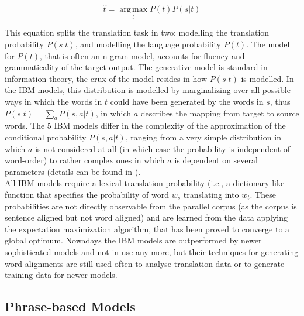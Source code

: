 \documentclass[a4paper, 11pt]{report}
\theoremstyle{definition}
\theoremstyle{plain}
\begin{document}
\[
\hat{t} = \operatorname*{arg\,max}_t P(t)P(s|t)
\]

This equation splits the translation task in two: modelling the translation probability $P(s|t)$, and modelling the language probability $P(t)$. The model for $P(t)$, that is often an n-gram model, accounts for fluency and grammaticality of the target output. The generative model is standard in information theory, the crux of the model resides in how $P(s|t)$ is modelled. In the IBM models, this distribution is modelled by marginalizing over all possible ways in which the words in $t$ could have been generated by the words in $s$, thus $P(s|t) = \sum_a P(s,a|t)$, in which $a$ describes the mapping from target to source words. The 5 IBM models differ in the complexity of the approximation of the conditional probability $P(s,a|t)$, ranging from a very simple distribution in which $a$ is not considered at all (in which case the probability is independent of word-order) to rather complex ones in which $a$ is dependent on several parameters (details can be found in \cite{brown1993mathematics}).\\
All IBM models require a lexical translation probability (i.e., a dictionary-like function that specifies the probability of word $w_s$ translating into $w_t$. These probabilities are not directly observable from the parallel corpus (as the corpus is sentence aligned but not word aligned) and are learned from the data applying the expectation maximization algorithm, that has been proved to converge to a global optimum. Nowadays the IBM models are outperformed by newer sophisticated models and not in use any more, but their techniques for generating word-alignments are still used often to analyse translation data or to generate training data for newer models.

\subsection{Phrase-based Models}
\end{document}
